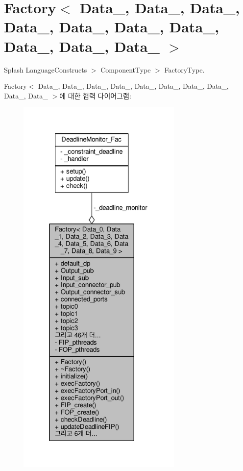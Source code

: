 \hypertarget{classFactory}{}\section{Factory$<$ Data\+\_, Data\+\_, Data\+\_, Data\+\_, Data\+\_, Data\+\_, Data\+\_, Data\+\_, Data\+\_, Data\+\_ $>$}
\label{classFactory}


Splash Language\+Constructs $>$ Component\+Type $>$ Factory\+Type.  




Factory$<$ Data\+\_, Data\+\_, Data\+\_, Data\+\_, Data\+\_, Data\+\_, Data\+\_, Data\+\_, Data\+\_, Data\+\_ $>$에 대한 협력 다이어그램\+:\nopagebreak
\begin{figure}[H]
\begin{center}
\leavevmode
\includegraphics[height=550pt]{classFactory__coll__graph}
\end{center}
\end{figure}
